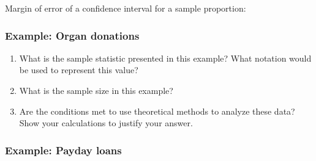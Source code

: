\documentclass[
]{report}
\newcommand{\rgs}{\vspace{12pt}} %
\begin{document}
Margin of error of a confidence interval for a sample proportion:
\rgs

\hypertarget{example-organ-donations-1}{%
\subsubsection*{Example: Organ donations}\label{example-organ-donations-1}}

\begin{enumerate}
\def\labelenumi{\arabic{enumi}.}
\item
  What is the sample statistic presented in this example? What notation would be used to represent this value?
  \rgs
\item
  What is the sample size in this example?
  \rgs
\item
  Are the conditions met to use theoretical methods to analyze these data? Show your calculations to justify your answer.
  \rgs
  \rgs
\end{enumerate}

\hypertarget{example-payday-loans}{%
\subsubsection*{Example: Payday loans}\label{example-payday-loans}}
\end{document}

